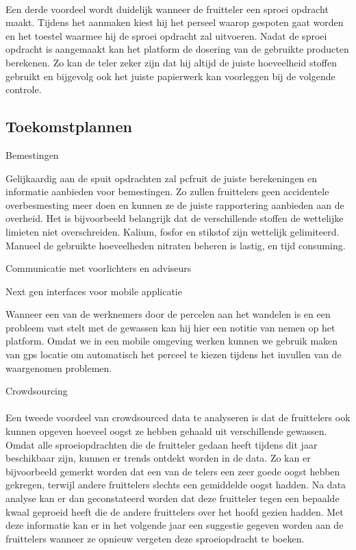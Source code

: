 \paragraph {} Een derde voordeel wordt duidelijk wanneer de fruitteler een sproei opdracht
maakt. Tijdens het aanmaken kiest hij het perseel waarop gespoten gaat worden en het
toestel waarmee hij de sproei opdracht zal uitvoeren. Nadat de sproei opdracht is
aangemaakt kan het platform de dosering van de gebruikte producten berekenen. Zo kan de
teler zeker zijn dat hij altijd de juiste hoeveelheid stoffen gebruikt en bijgevolg ook
het juiste papierwerk kan voorleggen bij de volgende controle.


\subsection {Toekomstplannen}

Bemestingen

Gelijkaardig aan de spuit opdrachten zal pcfruit de juiste berekeningen en informatie
aanbieden voor bemestingen. Zo zullen fruittelers geen accidentele overbesmesting meer doen en
kunnen ze de juiste rapportering aanbieden aan de overheid. Het is bijvoorbeeld
belangrijk dat de verschillende stoffen de wettelijke limieten niet overschreiden.
Kalium, fosfor en stikstof zijn wettelijk gelimiteerd. Manueel de gebruikte hoeveelheden
nitraten beheren is lastig, en tijd consuming.

Communicatie met voorlichters en adviseurs

Next gen interfaces voor mobile applicatie

Wanneer een van de werknemers door de percelen aan het wandelen is en een probleem vast
stelt met de gewassen kan hij hier een notitie van nemen op het platform. Omdat we in een
mobile omgeving werken kunnen we gebruik maken van gps locatie om automatisch het perceel
te kiezen tijdens het invullen van de waargenomen problemen.

Crowdsourcing

\paragraph {} Een tweede voordeel van crowdsourced data te analyseren is dat de fruittelers ook
kunnen opgeven hoeveel oogst ze hebben gehaald uit verschillende gewassen. Omdat alle
sproeiopdrachten die de fruitteler gedaan heeft tijdens dit jaar beschikbaar zijn, kunnen er
trends ontdekt worden in de data. Zo kan er bijvoorbeeld gemerkt worden dat een van de
telers een zeer goede oogst hebben gekregen, terwijl andere fruittelers slechts een gemiddelde
oogst hadden. Na data analyse kan er dan geconstateerd worden dat deze fruitteler tegen een
bepaalde kwaal geproeid heeft die de andere fruittelers over het hoofd gezien hadden. Met deze
informatie kan er in het volgende jaar een suggestie gegeven worden aan de fruittelers wanneer
ze opnieuw vergeten deze sproeiopdracht te boeken.

